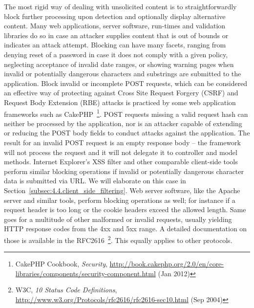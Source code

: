     The most rigid way of dealing with unsolicited content is to straightforwardly block further processing upon detection and optionally display alternative content. Many web applications, server software, run-times and validation libraries do so in case an attacker supplies content that is out of bounds or indicates an attack attempt. Blocking can have many facets, ranging from denying reset of a password in case it does not comply with a given policy, neglecting acceptance of invalid date ranges, or showing warning pages when invalid or potentially dangerous characters and substrings are submitted to the application. Block invalid or incomplete POST requests, which can be considered an effective way of protecting against Cross Site Request Forgery (CSRF) and Request Body Extension (RBE) attacks is practiced by some web application frameworks such as CakePHP~\footnote{CakePHP Cookbook, \textit{Security}, \url{http://book.cakephp.org/2.0/en/core-libraries/components/security-component.html} (Jan 2012)}. 
POST requests missing a valid request hash can neither be processed by the application, nor is an attacker capable of extending or reducing the POST body fields to conduct attacks against the application. The result for an invalid POST request is an empty response body -- the framework will not process the request and it will not delegate it to controller and model methods. Internet Explorer's XSS filter and other comparable client-side tools perform similar blocking operations if invalid or potentially dangerous character data is submitted via URL. We will elaborate on this case in Section~\ref{subsec:4.4.client_side_filtering}. Web server software, like the Apache server and similar tools, perform blocking operations as well; for instance if a request header is too long or the cookie headers exceed the allowed length. Same goes for a multitude of other malformed or invalid requests, usually yielding HTTP response codes from the 4xx and 5xx range. A detailed documentation on those is available in the 
RFC2616~\footnote{W3C, \textit{10 Status Code Definitions}, \url{http://www.w3.org/Protocols/rfc2616/rfc2616-sec10.html} (Sep 2004)}. 
    This equally applies to other protocols.\\

